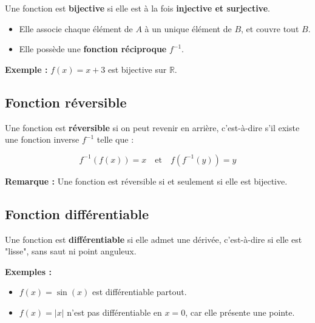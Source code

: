 \documentclass[12]{article}%
\theoremstyle{plain}
\theoremstyle{definition}
\theoremstyle{remark}
\begin{document}
Une fonction est \textbf{bijective} si elle est à la fois \textbf{injective et surjective}.

\begin{itemize}[label=--]
	\item Elle associe chaque élément de \( A \) à un unique élément de \( B \), et couvre tout \( B \).
	\item Elle possède une \textbf{fonction réciproque} \( f^{-1} \).
\end{itemize}

\textbf{Exemple :} \( f(x) = x + 3 \) est bijective sur \( \mathbb{R} \).

\vspace{0.5cm}

\subsection*{Fonction réversible}

Une fonction est \textbf{réversible} si on peut revenir en arrière, c'est-à-dire s’il existe une fonction inverse \( f^{-1} \) telle que :

\[
f^{-1}(f(x)) = x
\quad \text{et} \quad
f(f^{-1}(y)) = y
\]

\textbf{Remarque :} Une fonction est réversible si et seulement si elle est bijective.

\vspace{0.5cm}

\subsection*{Fonction différentiable}

Une fonction est \textbf{différentiable} si elle admet une dérivée, c’est-à-dire si elle est "lisse", sans saut ni point anguleux.

\textbf{Exemples :}
\begin{itemize}[label=--]
	\item \( f(x) = \sin(x) \) est différentiable partout.
	\item \( f(x) = |x| \) n'est pas différentiable en \( x = 0 \), car elle présente une pointe.
\end{itemize}


\newpage
\end{document}
